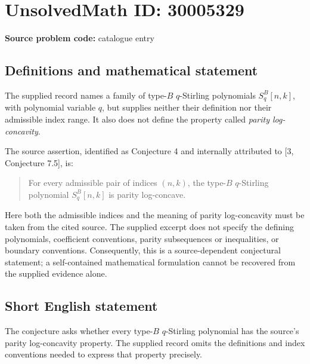 \documentclass[11pt]{article}
\begin{document}
\section*{UnsolvedMath ID: 30005329}
\textbf{Source problem code:} catalogue entry
\subsection{Definitions and mathematical statement}
The supplied record names a family of type-$B$ $q$-Stirling polynomials $S_q^B[n,k]$, with polynomial variable $q$, but supplies neither their definition nor their admissible index range. It also does not define the property called \emph{parity log-concavity}.

The source assertion, identified as Conjecture 4 and internally attributed to [3, Conjecture 7.5], is:
\begin{quote}
For every admissible pair of indices $(n,k)$, the type-$B$ $q$-Stirling polynomial $S_q^B[n,k]$ is parity log-concave.
\end{quote}
Here both the admissible indices and the meaning of parity log-concavity must be taken from the cited source. The supplied excerpt does not specify the defining polynomials, coefficient conventions, parity subsequences or inequalities, or boundary conventions. Consequently, this is a source-dependent conjectural statement; a self-contained mathematical formulation cannot be recovered from the supplied evidence alone.
\subsection{Short English statement}
The conjecture asks whether every type-$B$ $q$-Stirling polynomial has the source's parity log-concavity property. The supplied record omits the definitions and index conventions needed to express that property precisely.
\end{document}
